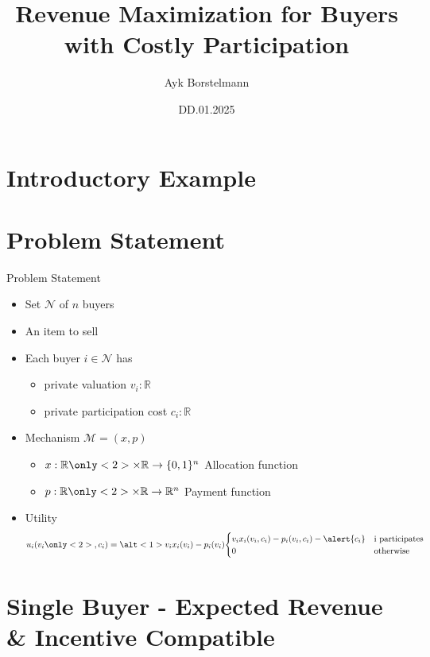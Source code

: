 \documentclass{beamer}
\title{Revenue Maximization for Buyers with Costly Participation}
\date{DD.01.2025}
\author{Ayk Borstelmann}
\institute{
    Seminar Algorithmic Game Theory
}
\begin{document}
\maketitle
\section{Introductory Example}
\section{Problem Statement}
\begin{frame}{Problem Statement}
  \begin{itemize}
    \item Set $\mathcal{N}$ of $n$ buyers
    \item An item to sell
    \item Each buyer $i \in \mathcal{N}$ has
          \begin{itemize}
            \item private valuation $v_i: \mathbb{R}$
            \item<2-> \alert{private participation cost $c_i: \mathbb{R}$}
          \end{itemize}
    \item Mechanism $\mathcal{M} = (x,p)$
          \begin{itemize}
            \item $x: \mathbb{R} \only<2>{\times \mathbb{R}} \rightarrow \{0,1\}^n$ Allocation function
            \item $p: \mathbb{R} \only<2>{\times \mathbb{R}} \rightarrow \mathbb{R}^n$ Payment function
          \end{itemize}
    \item Utility
          \begin{align*}
            u_i(v_i\only<2>{, c_i}) = \alt<1>{v_i x_i(v_i) - p_i(v_i)}{\begin{cases}v_i x_i(v_i, c_i) - p_i(v_i, c_i) - \alert{c_i} & \text{i participates} \\ 0 & \text{otherwise}\end{cases}}
          \end{align*}
  \end{itemize}
\end{frame}
\section{Single Buyer - Expected Revenue \& Incentive Compatible}
\end{document}
